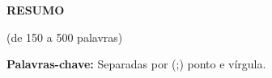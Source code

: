 \clearpage
\begingroup

\vspace*{-1.0cm}

\textbf{\MakeUppercase{RESUMO}}

{\small (de 150 a 500 palavras)}

\textbf{Palavras-chave:} Separadas por (;) ponto e vírgula.

\endgroup
\clearpage
